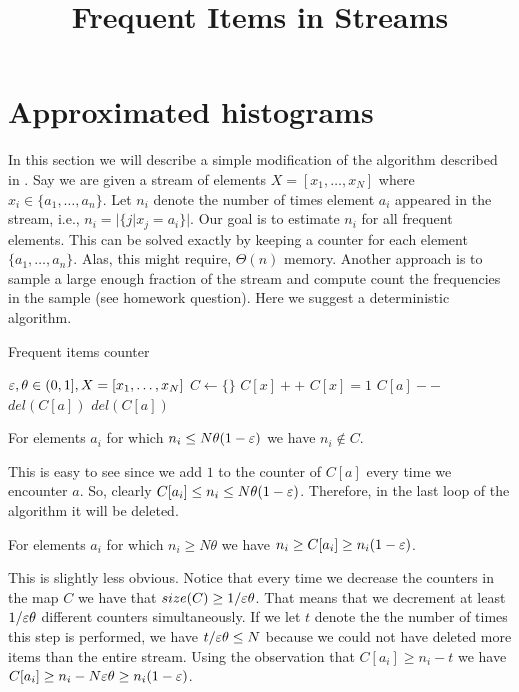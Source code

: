 \documentclass{article}
\title{Frequent Items in Streams} %
\begin{document}
\maketitle

\section{Approximated histograms}
In this section we will describe a simple modification of the algorithm described in \cite{Karp03asimple}.
Say we are given a stream of elements $X = [x_1,\ldots,x_N]$ where $x_i \in \{a_1,\ldots,a_n\}$.
Let $n_i$ denote the number of times element $a_i$ appeared in the stream, i.e., $n_i = |\{ j | x_j = a_i \}|$.
Our goal is to estimate $n_i$ for all frequent elements.
This can be solved exactly by keeping a counter for each element $\{a_1,\ldots,a_n\}$. 
Alas, this might require, $\Theta(n)$ memory. 
Another approach is to sample a large enough fraction of
the stream and compute count the frequencies in the sample (see homework question).
Here we suggest a deterministic algorithm.
%
\begin{algorithm}
\caption{Frequent items counter}
\begin{algorithmic}
 $\varepsilon,\theta \in (0,1], X = [x_1,\ldots,x_N]$
\STATE $C \leftarrow \{ \}$
		\STATE $C[x] ++$
		\STATE $C[x] = 1$
	\ELSE
			\STATE $C[a] --$
			 	\STATE $del(C[a])$
			\ENDIF
		\ENDFOR
	\ENDIF		
\ENDFOR
{}
		\STATE $del(C[a])$
	\ENDIF
\ENDFOR
\end{algorithmic}
\end{algorithm}
%
\begin{claim}
For elements $a_i$ for which $n_i \le N\theta(1-\varepsilon)$ we have $n_i \not\in C$.
\end{claim}
This is easy to see since we add $1$ to the counter of $C[a]$ every time we encounter $a$.
So, clearly $C[a_i] \le n_i \le N\theta(1-\varepsilon)$. Therefore, in the last loop of the algorithm it will be deleted.
\begin{claim}
For elements $a_i$ for which $n_i \ge N\theta$ we have $n_i \ge C[a_i] \ge n_i(1-\varepsilon)$.
\end{claim}
This is slightly less obvious.
Notice that every time we decrease the counters in the map $C$ we have that $size(C) \ge 1/\varepsilon\theta$.
That means that we decrement at least $1/\varepsilon\theta$ different counters simultaneously. 
If we let $t$ denote the the number of times 
this step is performed, we have $t/\varepsilon\theta \le N$ because we could not have deleted more items than the entire stream.
Using the observation that $C[a_i] \ge n_i - t$ we have $C[a_i] \ge n_i - N\varepsilon\theta \ge n_i(1-\varepsilon)$.
\end{document}
